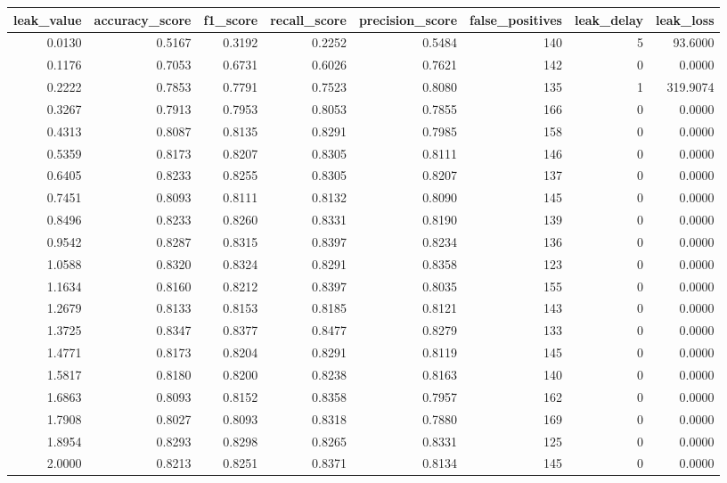 \begin{tabular}{rrrrrrrr}
\toprule
leak\_value & accuracy\_score & f1\_score & recall\_score & precision\_score & false\_positives & leak\_delay & leak\_loss \\
\midrule
0.0130 & 0.5167 & 0.3192 & 0.2252 & 0.5484 & 140 & 5 & 93.6000 \\
0.1176 & 0.7053 & 0.6731 & 0.6026 & 0.7621 & 142 & 0 & 0.0000 \\
0.2222 & 0.7853 & 0.7791 & 0.7523 & 0.8080 & 135 & 1 & 319.9074 \\
0.3267 & 0.7913 & 0.7953 & 0.8053 & 0.7855 & 166 & 0 & 0.0000 \\
0.4313 & 0.8087 & 0.8135 & 0.8291 & 0.7985 & 158 & 0 & 0.0000 \\
0.5359 & 0.8173 & 0.8207 & 0.8305 & 0.8111 & 146 & 0 & 0.0000 \\
0.6405 & 0.8233 & 0.8255 & 0.8305 & 0.8207 & 137 & 0 & 0.0000 \\
0.7451 & 0.8093 & 0.8111 & 0.8132 & 0.8090 & 145 & 0 & 0.0000 \\
0.8496 & 0.8233 & 0.8260 & 0.8331 & 0.8190 & 139 & 0 & 0.0000 \\
0.9542 & 0.8287 & 0.8315 & 0.8397 & 0.8234 & 136 & 0 & 0.0000 \\
1.0588 & 0.8320 & 0.8324 & 0.8291 & 0.8358 & 123 & 0 & 0.0000 \\
1.1634 & 0.8160 & 0.8212 & 0.8397 & 0.8035 & 155 & 0 & 0.0000 \\
1.2679 & 0.8133 & 0.8153 & 0.8185 & 0.8121 & 143 & 0 & 0.0000 \\
1.3725 & 0.8347 & 0.8377 & 0.8477 & 0.8279 & 133 & 0 & 0.0000 \\
1.4771 & 0.8173 & 0.8204 & 0.8291 & 0.8119 & 145 & 0 & 0.0000 \\
1.5817 & 0.8180 & 0.8200 & 0.8238 & 0.8163 & 140 & 0 & 0.0000 \\
1.6863 & 0.8093 & 0.8152 & 0.8358 & 0.7957 & 162 & 0 & 0.0000 \\
1.7908 & 0.8027 & 0.8093 & 0.8318 & 0.7880 & 169 & 0 & 0.0000 \\
1.8954 & 0.8293 & 0.8298 & 0.8265 & 0.8331 & 125 & 0 & 0.0000 \\
2.0000 & 0.8213 & 0.8251 & 0.8371 & 0.8134 & 145 & 0 & 0.0000 \\
\bottomrule
\end{tabular}
